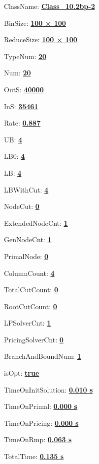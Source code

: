 \documentclass[11pt]{article}
\begin{document}
\pagestyle{empty}


ClassName: \underline{\textbf{Class_10.2bp-2}}
\par
BinSize: \underline{\textbf{100 × 100}}
\par
ReduceSize: \underline{\textbf{100 × 100}}
\par
TypeNum: \underline{\textbf{20}}
\par
Num: \underline{\textbf{20}}
\par
OutS: \underline{\textbf{40000}}
\par
InS: \underline{\textbf{35461}}
\par
Rate: \underline{\textbf{0.887}}
\par
UB: \underline{\textbf{4}}
\par
LB0: \underline{\textbf{4}}
\par
LB: \underline{\textbf{4}}
\par
LBWithCut: \underline{\textbf{4}}
\par
NodeCut: \underline{\textbf{0}}
\par
ExtendedNodeCnt: \underline{\textbf{1}}
\par
GenNodeCnt: \underline{\textbf{1}}
\par
PrimalNode: \underline{\textbf{0}}
\par
ColumnCount: \underline{\textbf{4}}
\par
TotalCutCount: \underline{\textbf{0}}
\par
RootCutCount: \underline{\textbf{0}}
\par
LPSolverCnt: \underline{\textbf{1}}
\par
PricingSolverCnt: \underline{\textbf{0}}
\par
BranchAndBoundNum: \underline{\textbf{1}}
\par
isOpt: \underline{\textbf{true}}
\par
TimeOnInitSolution: \underline{\textbf{0.010 s}}
\par
TimeOnPrimal: \underline{\textbf{0.000 s}}
\par
TimeOnPricing: \underline{\textbf{0.000 s}}
\par
TimeOnRmp: \underline{\textbf{0.063 s}}
\par
TotalTime: \underline{\textbf{0.135 s}}
\par
\newpage


\end{document}
